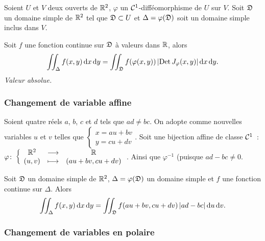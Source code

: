 \begin{theo}
  Soient \(U\) et \(V\) deux ouverts de \(\mathbb{R}^2\), \(\varphi\) un
  \(\mathcal{C}^{1}\)-difféomorphisme de \(U\) sur \(V\). Soit \(\mathfrak{D}\) un
  domaine simple de \(\mathbb{R}^2\) tel que \(\mathfrak{D} \subset U\) et \(\Delta =
  \varphi(\mathfrak{D})\) soit un domaine simple inclus dans \(V\).

  Soit \(f\) une fonction continue sur \(\mathfrak{D}\) à valeurs dans \(\mathbb{R}\),
  alors
  \begin{equation}
    \iint_\Delta f(x,y)\mathop{}\mathopen{}\mathrm{d} x \mathop{}\mathopen{}\mathrm{d} y = \iint_{\mathfrak{D}} f(\varphi(x,y))
    \left\lvert\operatorname{Det} J_\varphi(x,y)\right\rvert\mathop{}\mathopen{}\mathrm{d} x \mathop{}\mathopen{}\mathrm{d} y.
  \end{equation}
  \emph{Valeur absolue.}
\end{theo}

\subsubsection{Changement de variable affine}

\begin{theo}
  Soient quatre réels \(a\), \(b\), \(c\) et \(d\) tels que \(ad \neq bc\). On
  adopte comme nouvelles variables \(u\) et \(v\) telles que \(\begin{cases}
  x=au+bv \\ y=cu+dv \end{cases}\). Soit une bijection affine de classe
  \(\mathcal{C}^{1}\)~: \(\varphi\colon\left\{\begin{array}{ccc}\mathbb{R}^2 & \longrightarrow &\mathbb{R}\\(u,v) & \longmapsto & (au+bv, cu+dv)\end{array}\right.\).
  Ainsi que \(\varphi^{-1}\) (puisque \(ad-bc\neq 0\).

  Soit \(\mathfrak{D}\) un domaine simple de \(\mathbb{R}^2\),
  \(\Delta=\varphi(\mathfrak{D})\) un domaine simple et \(f\) une fonction continue
  sur \(\Delta\). Alors
  \begin{equation}
    \iint_\Delta f(x,y)\mathop{}\mathopen{}\mathrm{d} x \mathop{}\mathopen{}\mathrm{d} y = \iint_{\mathfrak{D}} f(au+bv, cu+dv)
    \left\lvert ad-bc\right\rvert\mathop{}\mathopen{}\mathrm{d} u \mathop{}\mathopen{}\mathrm{d} v.
  \end{equation}
\end{theo}

\subsubsection{Changement de variables en polaire}

